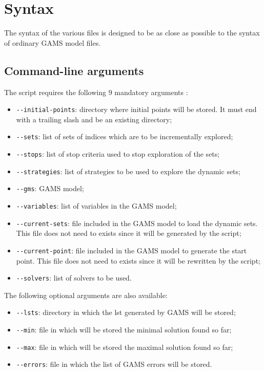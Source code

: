 \section*{Syntax}

The syntax of the various files is designed to be as close as possible to the
syntax of ordinary GAMS model files.

\subsection*{Command-line arguments}

The script requires the following 9 mandatory arguments :
\begin{itemize}
\item \texttt{-{}-initial-points}: directory where initial points will be
  stored. It must end with a trailing slash and be an existing directory;
\item \texttt{-{}-sets}: list of sets of indices which are to be
  incrementally explored;
\item \texttt{-{}-stops}: list of stop criteria used to stop exploration of
  the sets;
\item \texttt{-{}-strategies}: list of strategies to be used to explore the dynamic
  sets;
\item \texttt{-{}-gms}: GAMS model;
\item \texttt{-{}-variables}: list of variables in the GAMS model;
\item \texttt{-{}-current-sets}: file included in the GAMS model to load the
  dynamic sets. This file does not need to exists since it will be generated by
  the script;
\item \texttt{-{}-current-point}: file included in the GAMS model to generate the
  start point. This file does not need to exists since it will be rewritten by
  the script;
\item \texttt{-{}-solvers}: list of solvers to be used.
\end{itemize}
The following optional arguments are also available:
\begin{itemize}
\item \texttt{-{}-lsts}: directory in which the lst generated by GAMS will be
  stored;
\item \texttt{-{}-min}: file in which will be stored the minimal solution found so
  far;
\item \texttt{-{}-max}: file in which will be stored the maximal solution found so
  far;
\item \texttt{-{}-errors}: file in which the list of GAMS errors will be stored.
\end{itemize}

